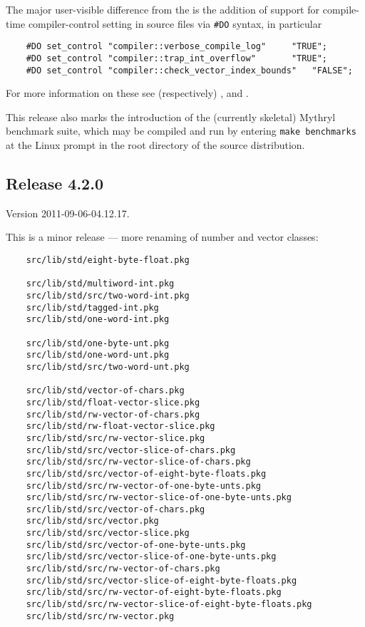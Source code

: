The major user-visible difference from the  
 is 
the addition of support for compile-time compiler-control setting 
in source files via {\tt #DO} syntax, in particular 

\begin{verbatim}
    #DO set_control "compiler::verbose_compile_log" 	"TRUE";
    #DO set_control "compiler::trap_int_overflow"   	"TRUE";
    #DO set_control "compiler::check_vector_index_bounds"   "FALSE";
\end{verbatim}

For more information on these see (respectively) 
, 
 and 
. 

This release also marks the introduction of the (currently skeletal) Mythryl benchmark 
suite, which may be compiled and run by entering {\tt make benchmarks} at the Linux 
prompt in the root directory of the source distribution. 

\cutend*




\subsection{Release 4.2.0}
\label{section:src:release-4.2.0}

Version 2011-09-06-04.12.17.

This is a minor release --- more renaming of number and vector classes:

\begin{verbatim}
    src/lib/std/eight-byte-float.pkg

    src/lib/std/multiword-int.pkg
    src/lib/std/src/two-word-int.pkg
    src/lib/std/tagged-int.pkg
    src/lib/std/one-word-int.pkg

    src/lib/std/one-byte-unt.pkg
    src/lib/std/one-word-unt.pkg
    src/lib/std/src/two-word-unt.pkg

    src/lib/std/vector-of-chars.pkg
    src/lib/std/float-vector-slice.pkg
    src/lib/std/rw-vector-of-chars.pkg
    src/lib/std/rw-float-vector-slice.pkg
    src/lib/std/src/rw-vector-slice.pkg
    src/lib/std/src/vector-slice-of-chars.pkg
    src/lib/std/src/rw-vector-slice-of-chars.pkg
    src/lib/std/src/vector-of-eight-byte-floats.pkg
    src/lib/std/src/rw-vector-of-one-byte-unts.pkg
    src/lib/std/src/rw-vector-slice-of-one-byte-unts.pkg
    src/lib/std/src/vector-of-chars.pkg
    src/lib/std/src/vector.pkg
    src/lib/std/src/vector-slice.pkg
    src/lib/std/src/vector-of-one-byte-unts.pkg
    src/lib/std/src/vector-slice-of-one-byte-unts.pkg
    src/lib/std/src/rw-vector-of-chars.pkg
    src/lib/std/src/vector-slice-of-eight-byte-floats.pkg
    src/lib/std/src/rw-vector-of-eight-byte-floats.pkg
    src/lib/std/src/rw-vector-slice-of-eight-byte-floats.pkg
    src/lib/std/src/rw-vector.pkg
\end{verbatim}

